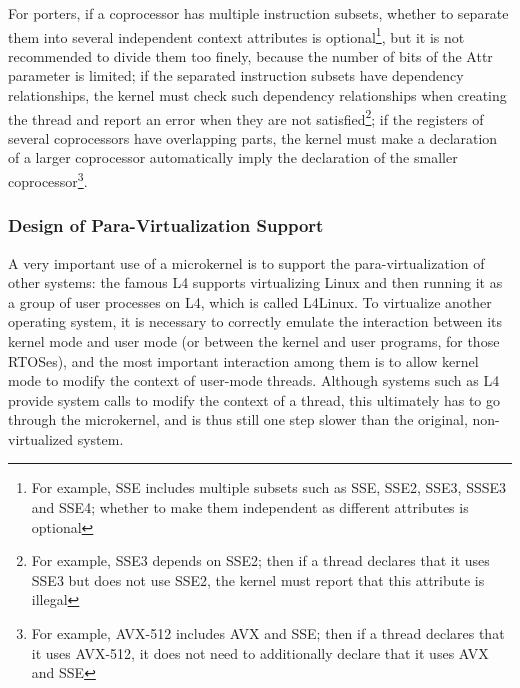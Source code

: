 \begin{enumerate}
  For porters, if a coprocessor has multiple instruction subsets, whether to separate them into several independent context attributes is optional\footnote{For example, SSE includes multiple subsets such as SSE, SSE2, SSE3, SSSE3 and SSE4; whether to make them independent as different attributes is optional}, but it is not recommended to divide them too finely, because the number of bits of the Attr parameter is limited; if the separated instruction subsets have dependency relationships, the kernel must check such dependency relationships when creating the thread and report an error when they are not satisfied\footnote{For example, SSE3 depends on SSE2; then if a thread declares that it uses SSE3 but does not use SSE2, the kernel must report that this attribute is illegal}; if the registers of several coprocessors have overlapping parts, the kernel must make a declaration of a larger coprocessor automatically imply the declaration of the smaller coprocessor\footnote{For example, AVX-512 includes AVX and SSE; then if a thread declares that it uses AVX-512, it does not need to additionally declare that it uses AVX and SSE}.
\end{enumerate}

\subsubsection{Design of Para-Virtualization Support}\label{subsubsec:4-paravirtualization-support-design}

A very important use of a microkernel is to support the para-virtualization of other systems: the famous L4 supports virtualizing Linux and then running it as a group of user processes on L4, which is called L4Linux. To virtualize another operating system, it is necessary to correctly emulate the interaction between its kernel mode and user mode (or between the kernel and user programs, for those RTOSes), and the most important interaction among them is to allow kernel mode to modify the context of user-mode threads. Although systems such as L4 provide system calls to modify the context of a thread, this ultimately has to go through the microkernel, and is thus still one step slower than the original, non-virtualized system.

